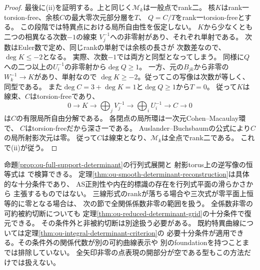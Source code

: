 \begin{proof}
最後に(ii)を証明する。上と同じく$\mathscr M_k$は一般点でrank二。
核$K$はrank一torsion-free、余核$C$の最大零次元部分層を$T$、
$Q=C/T$をrank一torsion-freeとする。
この段階では特異点における局所自由性を仮定しない。
$K$から少なくとも二つの相異なる次数$-1$の線束
$V_j^{-1}$への非零射があり、それぞれ単射である。
次数はEuler数で定め、同じrankの単射では余核の長さが
次数差なので、$\deg K\leq-2$となる。
実際、次数$-1$では両方と同型となってしまう。
同様に$Q$への二つ以上の$U_i^{-1}$の非零射から$\deg Q\geq1$。
一方、元の$B_{jk}$から非零の$W_k^{-1}\to K$があり、単射なので
$\deg K\geq-2$。従ってこの写像は次数が等しく、同型である。
また$\deg C=3+\deg K=1$と$\deg Q\geq1$から$T=0$。
従って$K$は線束、$C$はtorsion-freeであり、
\[
 0\to K\to\bigoplus_j V_j^{-1}\to
 \bigoplus_i U_i^{-1}\to C\to0
\]
は$C$の有限局所自由分解である。
各閉点の局所環は一次元Cohen--Macaulay環で、
$C$はtorsion-freeだから深さ一である。
Auslander--Buchsbaumの公式により$C$の局所射影次元は零。
従って$C$は線束となり、$\mathscr M_k$は全点でrank二である。
これで(ii)が従う。
\end{proof}

\begin{remark}
命題\ref{prop:ou-full-support-determinant}の行列式展開と
射影torus上の逆写像の恒等式は
で検算できる。
定理\ref{thm:ou-smooth-determinant-reconstruction}は具体的な十分条件であり、
AS正則性や内在的標識の存在を行列式平面の滑らかさから
主張するものではない。
三線形式のrankが落ちる場合や三次式が零平面上恒等的に零となる場合は、
次の節で全関係係数非零の範囲を扱う。
全係数非零の可約被約切断についても
定理\ref{thm:ou-reduced-determinant-grid}の十分条件で復元できる。
その条件外と非被約切断は別途扱う必要がある。
既約特異曲線については定理\ref{thm:ou-integral-determinant-criterion}の
必要十分条件が適用できる。その条件外の関係代数が別の可約曲線表示や
別のfoundationを持つことまでは排除していない。
全矢印非零の点表現の開部分が空である型もこの方法だけでは扱えない。
\end{remark}
